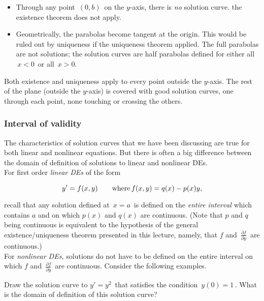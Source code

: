 \begin{itemize}
\item Through any point $\, (0,b)\,$ on the $y$-axis, there is \emph{no} solution curve.
  the existence theorem does not apply.
\item Geometrically, the parabolas become tangent at the origin.
  This would be ruled out by uniqueness if the uniqueness theorem applied.
  The full parabolas are not solutions;
  the solution curves are half parabolas defined for either all $\, x<0\,$ or all
  $\, x>0$. 
\end{itemize}

Both existence and uniqueness apply to every point outside the $y$-axis.
The rest of the plane (outside the $y$-axis) is covered with good solution curves,
one through each point, none touching or crossing the others.

\clearpage

\subsubsection{Interval of validity}

The characteristics of solution curves
that we have been discussing are true for both linear and nonlinear equations.
But there is often a big difference
between the domain of definition of solutions to linear and nonlinear DEs. \\

For first order \emph{linear DEs} of the form

\begin{equation*}
  \displaystyle  \displaystyle y'=f(x,y)
  \qquad \text {where}\, f(x,y)=q(x)-p(x)y,
\end{equation*}

recall that any solution defined at $\, x = a \,$ is defined on the \emph{entire interval}
which contains $a$ and on which $p(x)$ and $q(x)$ are continuous.
(Note that $p$ and $q$ being continuous is equivalent
to the hypothesis of the general existence/uniqueness theorem presented
in this lecture, namely, that $f$ and $\, \frac{\partial f}{\partial y}\,$ are continuous.)\\

For \emph{nonlinear DEs,} solutions do not have to be defined on the entire interval
on which $f$ and $\, \frac{\partial f}{\partial y}\,$ are continuous.
Consider the following examples. \\

\begin{example}
  Draw the solution curve to $y'=y^2\,$ that satisfies the condition $\, y(0)=1\,$.
  What is the domain of definition of this solution curve?
\end{example}


